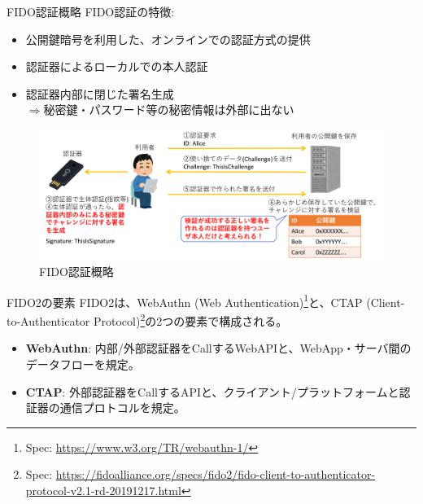 \documentclass[12pt,dvipdfmx,uplatex]{beamer}
\begin{document}
\begin{frame}{FIDO認証概略}
FIDO認証の特徴:
\begin{itemize}
 \item 公開鍵暗号を利用した、オンラインでの認証方式の提供
 \item 認証器によるローカルでの本人認証
 \item 認証器内部に閉じた署名生成\\ $\Rightarrow$\alert{秘密鍵・パスワード等の秘密情報は外部に出ない}
\end{itemize}
\begin{figure}
\begin{center}
\includegraphics[width=0.9\linewidth]{Figs/FIDO2-auth.pdf}
\caption{FIDO認証概略}
\end{center}
\end{figure}
\end{frame}

\begin{frame}{FIDO2の要素}
FIDO2は、\alert{WebAuthn (Web Authentication)\footnote[frame]{\tiny Spec: \url{https://www.w3.org/TR/webauthn-1/}}と、CTAP (Client-to-Authenticator Protocol)\footnote[frame]{\tiny Spec: \url{https://fidoalliance.org/specs/fido2/fido-client-to-authenticator-protocol-v2.1-rd-20191217.html}}の2つの要素で構成}される。

\begin{itemize}
 \item \textbf{WebAuthn}: 内部/外部認証器をCallするWebAPIと、WebApp・サーバ間のデータフローを規定。
 \item \textbf{CTAP}: 外部認証器をCallするAPIと、クライアント/プラットフォームと認証器の通信プロトコルを規定。
\end{itemize}
\end{frame}
\end{document}
